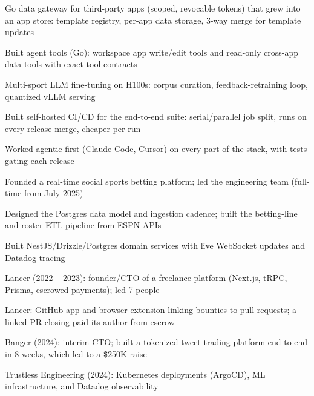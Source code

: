 \documentclass[print]{jack-resume}
\begin{document}
\begin{tightemize}
    \item Go data gateway for third-party apps (scoped, revocable tokens) that grew into an app store: template registry, per-app data storage, 3-way merge for template updates
    \item Built agent tools (Go): workspace app write/edit tools and read-only cross-app data tools with exact tool contracts
    \item Multi-sport LLM fine-tuning on H100s: corpus curation, feedback-retraining loop, quantized vLLM serving
    \item Built self-hosted CI/CD for the end-to-end suite: serial/parallel job split, runs on every release merge, cheaper per run
    \item Worked agentic-first (Claude Code, Cursor) on every part of the stack, with tests gating each release
\end{tightemize}
\sectionsep

\begin{tightemize}
    \item Founded a real-time social sports betting platform; led the engineering team (full-time from July 2025)
    \item Designed the Postgres data model and ingestion cadence; built the betting-line and roster ETL pipeline from ESPN APIs
    \item Built NestJS/Drizzle/Postgres domain services with live WebSocket updates and Datadog tracing
\end{tightemize}
\sectionsep

\begin{tightemize}
    \item Lancer (2022 -- 2023): founder/CTO of a freelance platform (Next.js, tRPC, Prisma, escrowed payments); led 7 people
    \item Lancer: GitHub app and browser extension linking bounties to pull requests; a linked PR closing paid its author from escrow
    \item Banger (2024): interim CTO; built a tokenized-tweet trading platform end to end in 8 weeks, which led to a \$250K raise
    \item Trustless Engineering (2024): Kubernetes deployments (ArgoCD), ML infrastructure, and Datadog observability
\end{tightemize}
\sectionsep
\end{document}
